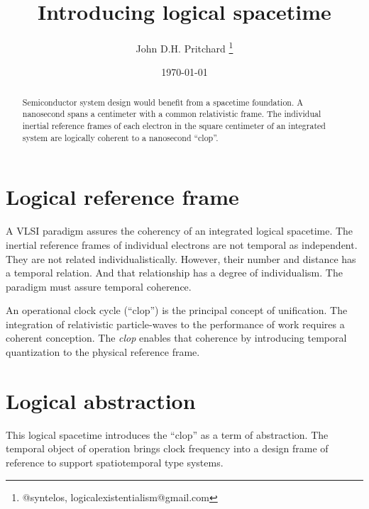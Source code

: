 \documentclass[12pt,twocolumn]{article}
\begin{document}
\title{Introducing logical spacetime}

\author{John D.H. Pritchard \thanks{@syntelos, logicalexistentialism@gmail.com}}

\date{\today}

\maketitle


\begin{abstract}

Semiconductor system design would benefit from a spacetime foundation.
A nanosecond spans a centimeter with a common relativistic frame.  The
individual inertial reference frames of each electron in the square
centimeter of an integrated system are logically coherent to a
nanosecond ``clop''.

\end{abstract}


\section{Logical reference frame}

A VLSI paradigm assures the coherency of an integrated logical
spacetime.  The inertial reference frames of individual electrons are
not temporal as independent.  They are not related
individualistically.  However, their number and distance has a
temporal relation.  And that relationship has a degree of
individualism.  The paradigm must assure temporal coherence.

An operational clock cycle (``clop'') is the principal concept of
unification.  The integration of relativistic particle-waves to the
performance of work requires a coherent conception.  The {\it clop}
enables that coherence by introducing temporal quantization to the
physical reference frame.

\section{Logical abstraction}

This logical spacetime introduces the ``clop'' as a term of
abstraction.  The temporal object of operation brings clock
frequency into a design frame of reference to support
spatiotemporal type systems.


%
%

\end{document}
